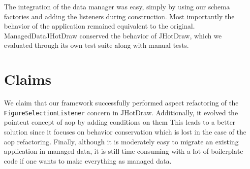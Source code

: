 The integration of the data manager was easy, simply by using our schema factories and adding the listeners during construction.
Most importantly the behavior of the application remained equivalent to the original.
ManagedDataJHotDraw conserved the behavior of JHotDraw, which we evaluated through its own test suite along with manual tests.


\section{Claims}
We claim that our framework successfully performed aspect refactoring of the \texttt{FigureSelectionListener} concern in JHotDraw.
Additionally, it evolved the pointcut concept of \ac{aop} by adding conditions on them
This leads to a better solution since it focuses on behavior conservation which is lost in the case of the \ac{aop} refactoring.
Finally, although it is moderately easy to migrate an existing application in managed data, it is still time consuming with a lot of boilerplate code if one wants to make everything as managed data.
